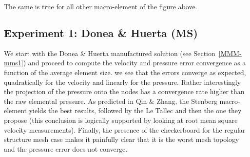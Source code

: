 The same is true for all other macro-element of the figure above. 





\newpage
\subsection*{Experiment 1: Donea \& Huerta (MS)}

We start with the Donea \& Huerta manufactured solution (see Section~\ref{MMM-mms1}) and 
proceed to compute the velocity and pressure error convergence as a function of the 
average element size.
we see that the errors converge as expected, quadratically for the velocity and linearly for the pressure.
Rather interestingly the projection of the pressure onto the nodes has a convergence rate 
higher than the raw elemental pressure. As predicted in Qin \& Zhang, the Stenberg macro-element 
yields the best results, followed by the Le Tallec and then the one they propose (this conclusion 
is logically supported by looking at root mean square velocity measurements). 
Finally, the presence of the checkerboard for the regular structure mesh case
makes it painfully clear that it is the worst mesh topology 
and the pressure error does not converge.  

